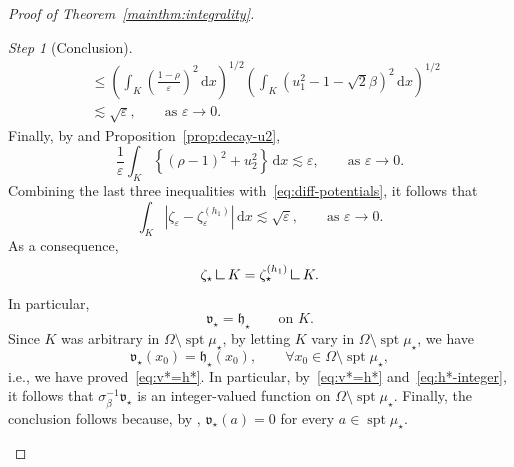 \documentclass[a4paper, 11pt, twoside, leqno]{article}
\theoremstyle{definition}              %
\theoremstyle{remark}                  %
\newtheorem{step}{Step}
\DeclareMathOperator{\spt}{spt}                                     %
\newcommand{\abs}[1]{\left| #1 \right|}                             %
\renewcommand{\d}{\mathrm{d}}
\newcommand{\Q}{\mathbf{Q}}
\renewcommand{\u}{\mathbf{u}}
\newcommand{\eps}{\varepsilon}
\newcommand{\bbV}{\mathbb{V}}
\newcommand{\mres}{\mathbin{\vrule height 1.6ex depth 0pt width
0.13ex\vrule height 0.13ex depth 0pt width 1.3ex}}
\begin{document}
\begin{proof}[{Proof of Theorem~\ref{mainthm:integrality}}]
\begin{step}[Conclusion]
\[\begin{split}
		&\leq \left(\int_K \left(\frac{1-\rho}{\eps}\right)^2 \,{\d}x \right)^{1/2} \left( \int_K \left(u_1^2 - 1 - \sqrt{2}\beta\right)^2 \,{\d}x \right)^{1/2} \\ 
		&\lesssim \sqrt{\eps}, \qquad \mbox{as } \eps \to 0.
	\end{split}
	\]
	Finally, by \cite[Proposition~2.6]{CDS1} and 
	Proposition~\ref{prop:decay-u2}, 
	\[
		\frac{1}{\eps} \int_K \left\{ (\rho - 1)^2 + u_2^2 \right\}\,{\d}x 
		\lesssim \eps, \qquad \mbox{as } \eps \to 0.
	\]
	Combining the last three inequalities with~\eqref{eq:diff-potentials}, 
	it follows that
	\[
		\int_K \abs{ \zeta_\eps - \zeta_\eps^{(h_1)} }\,{\d}x 
		\lesssim \sqrt{\eps}, \qquad \mbox{as } \eps \to 0.
	\]
	As a consequence, 
	\[
		\zeta_\star \mres K = \zeta_\star^{(h_1)} \mres K.
	\]
	In particular,
	\[
		\mathfrak{v}_\star = \mathfrak{h}_\star \qquad \mbox{on } K.
	\]
	Since $K$ was arbitrary in $\Omega \setminus \spt\mu_\star$, 
	by letting $K$ vary in $\Omega \setminus \spt\mu_\star$, we have 
	\[
		\mathfrak{v}_\star(x_0) = \mathfrak{h}_\star(x_0),  
		\qquad \forall x_0 \in \Omega \setminus \spt \mu_\star,
	\]
	i.e., we have proved~\eqref{eq:v*=h*}. 
	In particular, by~\eqref{eq:v*=h*} and~\eqref{eq:h*-integer}, 
	it follows that $\sigma_\beta^{-1} \mathfrak{v}_\star$ is an integer-valued 
	function on $\Omega \setminus \spt\mu_\star$. 
	Finally, the conclusion follows because, by \cite[Proposition~3.18(ii)]{CDS2},  
	$\mathfrak{v}_\star(a) = 0$ for every $a \in \spt\mu_\star$. 
	\end{step}

\end{proof}
\end{document}
